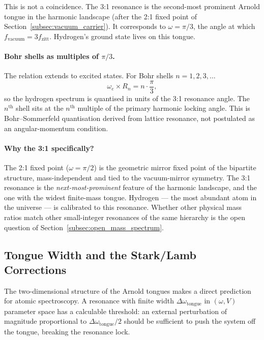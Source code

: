 This is not a coincidence. The 3:1 resonance is the second-most
prominent Arnold tongue in the harmonic landscape (after the 2:1
fixed point of Section~\ref{subsec:vacuum_carrier}). It corresponds
to $\omega = \pi/3$, the angle at which $f_\text{vacuum} = 3
f_\text{zitt}$. Hydrogen's ground state lives on this tongue.

\paragraph{Bohr shells as multiples of $\pi/3$.}
The relation extends to excited states. For Bohr shells $n = 1, 2,
3, \ldots$
\begin{equation}
    \omega_e \times R_n = n \cdot \frac{\pi}{3},
    \label{eq:bohr_pi3}
\end{equation}
so the hydrogen spectrum is quantised in units of the 3:1
resonance angle. The $n^\text{th}$ shell sits at the $n^\text{th}$
multiple of the primary harmonic locking angle. This is
Bohr--Sommerfeld quantisation derived from lattice resonance, not
postulated as an angular-momentum condition.

\paragraph{Why the 3:1 specifically?}
The 2:1 fixed point ($\omega = \pi/2$) is the geometric mirror
fixed point of the bipartite structure, mass-independent and tied
to the vacuum-mirror symmetry. The 3:1 resonance is the
\emph{next-most-prominent} feature of the harmonic landscape, and
the one with the widest finite-mass tongue. Hydrogen --- the most
abundant atom in the universe --- is calibrated to this resonance.
Whether other physical mass ratios match other small-integer
resonances of the same hierarchy is the open question of
Section~\ref{subsec:open_mass_spectrum}.

\subsection{Tongue Width and the Stark/Lamb Corrections}
\label{subsec:tongue_width_predictions}

The two-dimensional structure of the Arnold tongues makes a direct
prediction for atomic spectroscopy.
A resonance with finite width
$\Delta\omega_\text{tongue}$ in $(\omega, V)$ parameter space has a
calculable threshold: an external perturbation of magnitude
proportional to $\Delta\omega_\text{tongue}/2$ should be sufficient
to push the system off the tongue, breaking the resonance lock.

